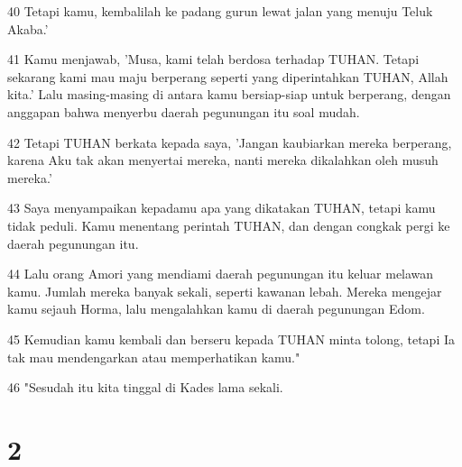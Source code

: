 \par 40 Tetapi kamu, kembalilah ke padang gurun lewat jalan yang menuju Teluk Akaba.'
\par 41 Kamu menjawab, 'Musa, kami telah berdosa terhadap TUHAN. Tetapi sekarang kami mau maju berperang seperti yang diperintahkan TUHAN, Allah kita.' Lalu masing-masing di antara kamu bersiap-siap untuk berperang, dengan anggapan bahwa menyerbu daerah pegunungan itu soal mudah.
\par 42 Tetapi TUHAN berkata kepada saya, 'Jangan kaubiarkan mereka berperang, karena Aku tak akan menyertai mereka, nanti mereka dikalahkan oleh musuh mereka.'
\par 43 Saya menyampaikan kepadamu apa yang dikatakan TUHAN, tetapi kamu tidak peduli. Kamu menentang perintah TUHAN, dan dengan congkak pergi ke daerah pegunungan itu.
\par 44 Lalu orang Amori yang mendiami daerah pegunungan itu keluar melawan kamu. Jumlah mereka banyak sekali, seperti kawanan lebah. Mereka mengejar kamu sejauh Horma, lalu mengalahkan kamu di daerah pegunungan Edom.
\par 45 Kemudian kamu kembali dan berseru kepada TUHAN minta tolong, tetapi Ia tak mau mendengarkan atau memperhatikan kamu."
\par 46 "Sesudah itu kita tinggal di Kades lama sekali.

\chapter{2}

